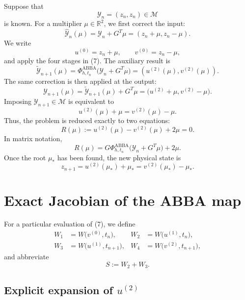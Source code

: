 \documentclass[11pt,a4paper]{article}
\newcommand{\R}{\mathbb{R}}
\newcommand{\Y}{\mathcal{Y}}
\newcommand{\M}{\mathcal{M}}
\newcommand{\PhiAB}{\Phi^{\mathrm{ABBA}}_{h,t_n}}
\begin{document}
Suppose that
\[
 \Y_n=(z_n,z_n)\in\M
\]
is known. For a multiplier $\mu\in\R^2$, we first correct the input:
\[
 \widehat{\Y}_n(\mu)
 =\Y_n+G^T\mu
 =(z_n+\mu,z_n-\mu).
\]
We write
\[
 u^{(0)}=z_n+\mu,
 \qquad
 v^{(0)}=z_n-\mu,
\]
and apply the four stages in (7). The auxiliary result is
\[
 \widetilde{\Y}_{n+1}(\mu)
 =\PhiAB\bigl(\Y_n+G^T\mu\bigr)
 =(u^{(2)}(\mu),v^{(2)}(\mu)).
\]
The same correction is then applied at the output:
\[
 \Y_{n+1}(\mu)
 =\widetilde{\Y}_{n+1}(\mu)+G^T\mu
 =\bigl(u^{(2)}+\mu,v^{(2)}-\mu\bigr). \tag{10}
\]
Imposing $\Y_{n+1}\in\M$ is equivalent to
\[
 u^{(2)}(\mu)+\mu=v^{(2)}(\mu)-\mu.
\]
Thus, the problem is reduced exactly to two equations:
\[
 \boxed{
 R(\mu)
 :=u^{(2)}(\mu)-v^{(2)}(\mu)+2\mu=0.
 } \tag{11}
\]
In matrix notation,
\[
 R(\mu)
 =G\PhiAB\bigl(\Y_n+G^T\mu\bigr)+2\mu. \tag{12}
\]
Once the root $\mu_*$ has been found, the new physical state is
\[
 \boxed{
 z_{n+1}=u^{(2)}(\mu_*)+\mu_*
          =v^{(2)}(\mu_*)-\mu_*.
 } \tag{13}
\]

\section{Exact Jacobian of the ABBA map}

For a particular evaluation of (7), we define
\begin{align*}
 W_1&=W\bigl(v^{(0)},t_n\bigr),
 &W_2&=W\bigl(u^{(1)},t_n\bigr),\\
 W_3&=W\bigl(u^{(1)},t_{n+1}\bigr),
 &W_4&=W\bigl(v^{(2)},t_{n+1}\bigr),
\end{align*}
and abbreviate
\[
 S:=W_2+W_3.
\]

\subsection*{Explicit expansion of \texorpdfstring{$u^{(2)}$}{u(2)}}
\end{document}

